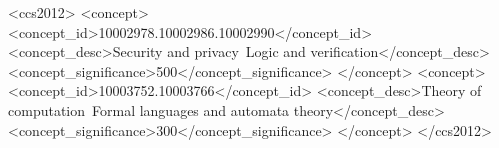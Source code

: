 %

 \begin{CCSXML}
<ccs2012>
<concept>
<concept_id>10002978.10002986.10002990</concept_id>
<concept_desc>Security and privacy~Logic and verification</concept_desc>
<concept_significance>500</concept_significance>
</concept>
<concept>
<concept_id>10003752.10003766</concept_id>
<concept_desc>Theory of computation~Formal languages and automata theory</concept_desc>
<concept_significance>300</concept_significance>
</concept>
</ccs2012>
\end{CCSXML}

%
%

\keywords{\papershellkw}
